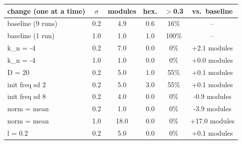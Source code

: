 \begin{tabular}{lccccc}
\toprule
change (one at a time) & $\sigma$ & modules & hex. & $>$0.3 & vs.\ baseline \\
\midrule
baseline (9 runs) & 0.2 & 4.9 & 0.6 & 16\% & -- \\
baseline (1 run) & 1.0 & 1.0 & 1.0 & 100\% & -- \\
k_n = -4 & 0.2 & 7.0 & 0.0 & 0\% & +2.1 modules \\
k_n = -4 & 1.0 & 1.0 & 0.0 & 0\% & +0.0 modules \\
D = 20 & 0.2 & 5.0 & 1.0 & 55\% & +0.1 modules \\
init freq sd 2 & 0.2 & 5.0 & 3.0 & 55\% & +0.1 modules \\
init freq sd 8 & 0.2 & 4.0 & 0.0 & 0\% & -0.9 modules \\
norm = mean & 0.2 & 1.0 & 0.0 & 0\% & -3.9 modules \\
norm = mean & 1.0 & 18.0 & 0.0 & 0\% & +17.0 modules \\
l = 0.2 & 0.2 & 5.0 & 0.0 & 0\% & +0.1 modules \\
\bottomrule
\end{tabular}
